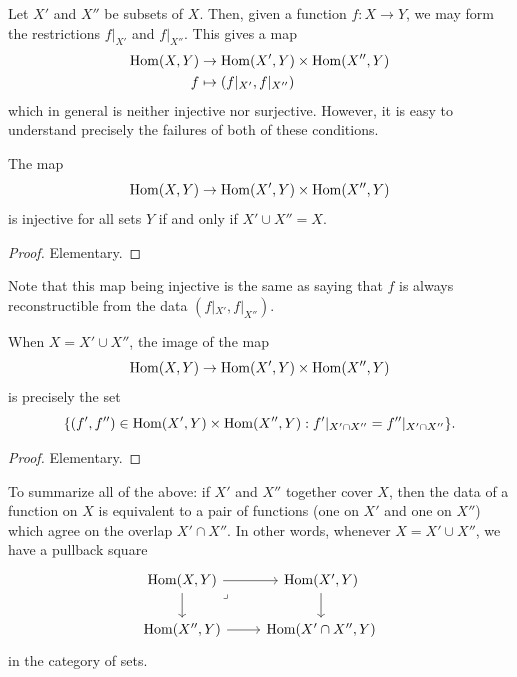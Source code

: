 Let $X'$ and $X''$ be subsets of $X$. Then, given a function $f : X \to Y$, we may form the restrictions $f|_{X'}$ and $f|_{X''}$. This gives a map
\begin{align*}
    \operatorname{Hom}(X, Y) & \to \operatorname{Hom}(X',Y) \times \operatorname{Hom}(X'',Y) \\
    f          & \mapsto (f|_{X'}, f|_{X''})
\end{align*}
which in general is neither injective nor surjective. However, it is easy to understand precisely the failures of both of these conditions.

\begin{proposition}\label{prop:chap:sheaves:sec:intro:injectivity of restriction maps}
    The map
    \[
        \operatorname{Hom}(X, Y) \to \operatorname{Hom}(X',Y) \times \operatorname{Hom}(X'',Y)
    \]
    is injective for all sets $Y$ if and only if $X' \cup X'' = X$.
\end{proposition}
\begin{proof}
    Elementary.
\end{proof}

Note that this map being injective is the same as saying that $f$ is always reconstructible from the data $(f|_{X'}, f|_{X''})$.

\begin{proposition}\label{prop:chap:sheaves:sec:intro:image of restriction maps}
    When $X = X' \cup X''$, the image of the map
    \[
        \operatorname{Hom}(X, Y) \to \operatorname{Hom}(X',Y) \times \operatorname{Hom}(X'',Y)
    \]
    is precisely the set
    \[
        \{(f',f'') \in \operatorname{Hom}(X',Y) \times \operatorname{Hom}(X'', Y) : f'|_{X' \cap X''} = f''|_{X' \cap X''}\}.
    \]
\end{proposition}
\begin{proof}
    Elementary.
\end{proof}

To summarize all of the above: if $X'$ and $X''$ together cover $X$, then the data of a function on $X$ is equivalent to a pair of functions (one on $X'$ and one on $X''$) which agree on the overlap $X' \cap X''$. In other words, whenever $X = X' \cup X''$, we have a pullback square
\[\begin{tikzcd}[ampersand replacement=\&]
        {\Hom(X,Y)} \& {\Hom(X',Y)} \\
        {\Hom(X'',Y)} \& {\Hom(X' \cap X'',Y)}
        \arrow[from=1-1, to=1-2]
        \arrow[from=1-1, to=2-1]
        \arrow["\lrcorner"{anchor=center, pos=0.125}, draw=none, from=1-1, to=2-2]
        \arrow[from=1-2, to=2-2]
        \arrow[from=2-1, to=2-2]
    \end{tikzcd}\]
in the category of sets.


